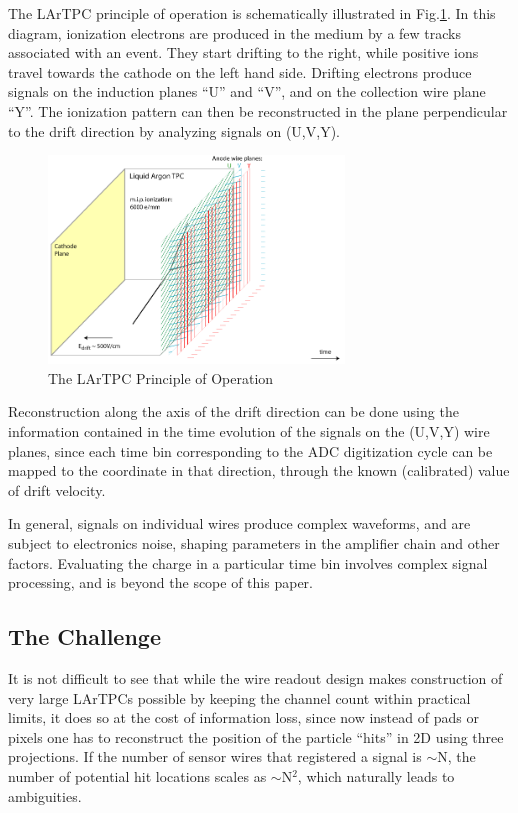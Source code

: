 \documentclass[a4paper]{jpconf}
\begin{document}
The LArTPC principle of operation is schematically illustrated in Fig.\ref{fig:lartpc-principle}.
In this diagram, ionization electrons are
produced in the medium by a few tracks associated with an event. They start drifting to the right, while
positive ions travel towards the cathode on the left hand side. Drifting electrons produce signals on the induction planes ``U''
and ``V'', and  on the collection wire plane ``Y''. The ionization pattern can then be reconstructed
 in the plane perpendicular to the drift direction by analyzing signals on (U,V,Y). 
\begin{figure}[h!]
	\centering
	\includegraphics[width=0.7\textwidth]{signal-0.png}
	\caption{The LArTPC Principle of Operation}
	\label{fig:lartpc-principle}
\end{figure}
Reconstruction along the axis of the drift direction
can be done using the information contained in the time evolution of the signals on the (U,V,Y) wire planes, since each time bin corresponding to the
ADC digitization cycle can be mapped to the coordinate in that direction, through the known (calibrated) value of drift velocity.

In general, signals on individual wires produce complex waveforms, and are subject to electronics noise, shaping parameters in the
amplifier chain and other factors. Evaluating the charge in a particular time bin involves complex signal processing, and
is beyond the scope of this paper.

\subsection{The Challenge}
\label{ambiguity}
It is not difficult to see that while the wire readout design makes construction of very large LArTPCs possible by keeping the channel count
within practical limits,
it does so at the cost of information loss, since now instead of pads or pixels one has to reconstruct the position of the
particle ``hits'' in 2D using three projections. If the number of sensor wires that
registered a signal is $\sim$N, the number of potential hit locations scales as $\sim$N$^2$, which naturally leads to ambiguities.
\end{document}
